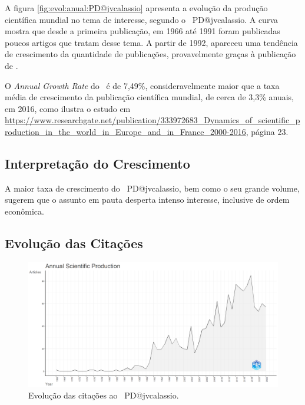 A figura \ref{fig:evol:anual:PD@jvcalassio} apresenta a evolução da produção científica mundial no tema de interesse, segundo o \dataset\   PD@jvcalassio. A curva mostra que desde a primeira publicação, em 1966 até 1991 foram publicadas poucos artigos que tratam desse tema. A partir de 1992, apareceu uma tendência de crescimento da quantidade de publicações, provavelmente graças à publicação de \citet{poundstone_prisoners_1992}.

O \textit{Annual Growth Rate} do \dataset\   é de 7,49\%, consideravelmente maior que a taxa média de crescimento da publicação científica mundial, de cerca de 3,3\% anuais, em 2016, como ilustra o estudo em \url{https://www.researchgate.net/publication/333972683_Dynamics_of_scientific_production_in_the_world_in_Europe_and_in_France_2000-2016}, página 23.

\subsection{Interpretação do Crescimento} A maior taxa de crescimento do \dataset\   PD@jvcalassio, bem como o seu grande volume, sugerem que o assunto em pauta desperta intenso interesse, inclusive de ordem econômica.

\subsection{Evolução das Citações}

\begin{figure}
    \centering
    \includegraphics[width=1\textwidth]{exploratory-data-analysis/jvcalassio/PesqBibliogr/PrisonersDilemma/WoS-20221201/Dataset/AnnualScientificProduction-2022-12-01.png}
    \caption{Evolução das citações ao \dataset\   PD@jvcalassio.}
    \label{fig:evol:anual:citacoes:PD@jvcalassio}
    
\end{figure}

